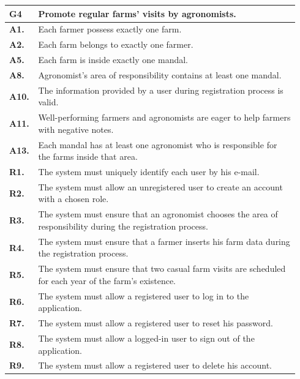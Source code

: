\begin{longtable}{p{0.06\linewidth} p{0.88\linewidth}} 
    \toprule
    \textbf{G4} & Promote regular farms’ visits by agronomists. \\ 
    \midrule
    \textbf{A1.} & Each farmer possess exactly one farm.\\
    \textbf{A2.} & Each farm belongs to exactly one farmer.\\ 
    \textbf{A5.} & Each farm is inside exactly one mandal.\\ 
    \textbf{A8.} & Agronomist's area of responsibility contains at least one mandal.\\ 
    \textbf{A10.} & The information provided by a user during registration process is valid.\\ 
    \textbf{A11.} & Well-performing farmers and agronomists are eager to help farmers with negative notes.\\ 
    \textbf{A13.} & Each mandal has at least one agronomist who is responsible for the farms inside that area.\\ 
    \midrule
    
	\textbf{R1.} & The system must uniquely identify each user by his e-mail. \\
	\textbf{R2.} & The system must allow an unregistered user to create an account with a chosen role. \\
	\textbf{R3.} & The system must ensure that an agronomist chooses the area of responsibility during the registration process. \\
	\textbf{R4.} & The system must ensure that a farmer inserts his farm data during the registration process.\\
	\textbf{R5.} & The system must ensure that two casual farm visits are scheduled for each year of the farm's existence.\\
	\textbf{R6.} & The system must allow a registered user to log in to the application. \\
	\textbf{R7.} & The system must allow a registered user to reset his password. \\
	\textbf{R8.} & The system must allow a logged-in user to sign out of the application. \\
	\textbf{R9.} & The system must allow a registered user to delete his account. \\
	

\end{longtable}
